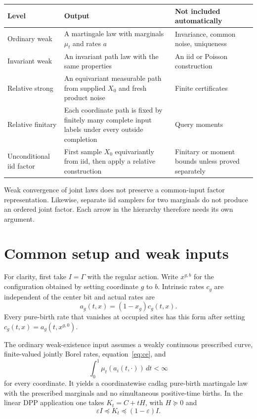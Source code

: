 \documentclass[11pt]{article}
\theoremstyle{definition}
\theoremstyle{remark}
\newcommand{\1}{\mathbf{1}}
\newcommand{\eps}{\varepsilon}
\begin{document}
\begin{center}
\begin{tabular}{>{\raggedright\arraybackslash}p{}
                >{\raggedright\arraybackslash}p{}
                >{\raggedright\arraybackslash}p{}}
\toprule
Level & Output & Not included automatically\\
\midrule
Ordinary weak & A martingale law with marginals $\mu_t$ and rates $a$ & Invariance, common noise, uniqueness\\
Invariant weak & An invariant path law with the same properties & An iid or Poisson construction\\
Relative strong & An equivariant measurable path from supplied $X_0$ and fresh product noise & Finite certificates\\
Relative finitary & Each coordinate path is fixed by finitely many complete input labels under every outside completion & Query moments\\
Unconditional iid factor & First sample $X_0$ equivariantly from iid, then apply a relative construction & Finitary or moment bounds unless proved separately\\
\bottomrule
\end{tabular}
\end{center}

Weak convergence of joint laws does not preserve a common-input factor
representation.  Likewise, separate iid samplers for two marginals do not
produce an ordered joint factor.  Each arrow in the hierarchy therefore needs
its own argument.

\section{Common setup and weak inputs}

For clarity, first take $I=\Gamma$ with the regular action.  Write $x^{g,b}$
for the configuration obtained by setting coordinate $g$ to $b$.  Intrinsic
rates $c_g$ are independent of the center bit and actual rates are
\[
 a_g(t,x)=(1-x_g)c_g(t,x).
\]
Every pure-birth rate that vanishes at occupied sites has this form after
setting $c_g(t,x)=a_g(t,x^{g,0})$.

The ordinary weak-existence input assumes a weakly continuous prescribed
curve, finite-valued jointly Borel rates, equation~\eqref{eq:ce}, and
\[
 \int_0^1\mu_t(a_i(t,\cdot))\,dt<\infty
\]
for every coordinate.  It yields a coordinatewise cadlag pure-birth
martingale law with the prescribed marginals and no simultaneous
positive-time births.  In the linear DPP application one takes
$K_t=C+tH$, with $H\succeq0$ and
\[
 \eps I\preceq K_t\preceq(1-\eps)I.
\]
\end{document}
